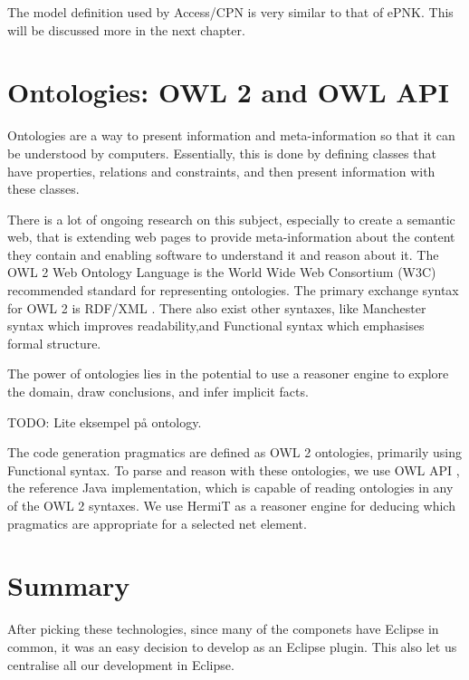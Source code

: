 The model definition used by Access/CPN is very similar to that of ePNK. This
will be discussed more in the next chapter.

\section{Ontologies: OWL 2 and OWL API}\label{sec:ontologies}

Ontologies are a way to present information and meta-information so that it can
be understood by computers. Essentially, this is done by defining classes that
have properties, relations and constraints, and then present
information with these classes.

There is a lot of ongoing research on this subject, especially to create a
semantic web, that is extending web pages to provide meta-information about the
content they contain and enabling software to understand it and reason about it.
The OWL 2 Web Ontology Language \cite{owl2-overview} is the World Wide Web
Consortium (W3C) recommended standard for representing ontologies. The primary
exchange syntax for OWL 2 is RDF/XML \cite{rdf-xml}. There also exist
other syntaxes, like Manchester syntax which improves readability,and
Functional syntax which emphasises formal structure.

The power of ontologies lies in the potential to use a reasoner engine to
explore the domain, draw conclusions, and infer implicit facts.

TODO: Lite eksempel på ontology.

The code generation pragmatics are defined as OWL 2 ontologies, primarily using
Functional syntax. To parse and reason with these ontologies, we use OWL API
\cite{owlapi}, the reference Java implementation, which is capable of reading
ontologies in any of the OWL 2 syntaxes. We use HermiT as a reasoner engine for
deducing which pragmatics are appropriate for a selected net element.

\section{Summary}
After picking these technologies, since many of the componets have Eclipse in
common, it was an easy decision to develop \thename{} as an Eclipse plugin.
This also let us centralise all our development in Eclipse.

